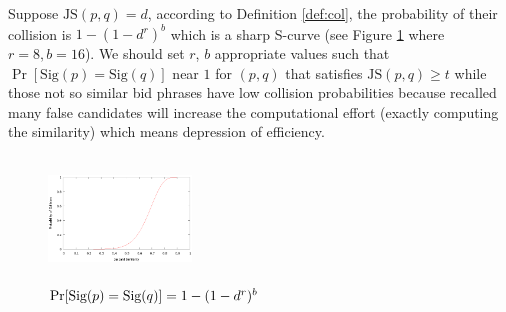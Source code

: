 Suppose $\text{JS}(p,q)=d$, according to Definition \ref{def:col}, the probability of their
collision is $1-(1-d^r)^b$ which is a sharp S-curve (see Figure
        \ref{fig:scurve} where $r=8, b=16$). 
We should set $r$, $b$ appropriate values such that %
$\Pr[\text{Sig}(p)=\text{Sig}(q)]$ near $1$ for $(p,q)$ that satisfies
$\text{JS}(p,q)\geq t$ while those not so similar bid phrases have low
collision probabilities because recalled many false candidates will increase the
computational effort (exactly computing the similarity) which means
depression of efficiency.
\begin{figure}
\centering
\includegraphics[width=1.5in, height=1.3in]{figures/scurve.eps}
\caption{$\Pr[\textnormal{Sig}(p)=\textnormal{Sig}(q)]=1-(1-d^r)^b$}
\label{fig:scurve}
\end{figure}



